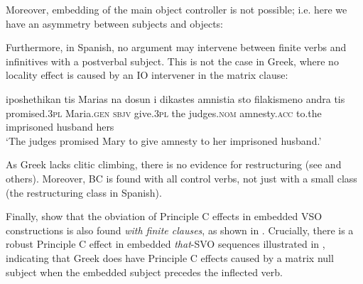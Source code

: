 \documentclass[output=paper]{langsci/langscibook}
\begin{document}
Moreover, embedding of the main object controller is not possible; i.e. here we have an asymmetry between subjects and objects:

\ea%
    \label{ex:alexiadou:22}
    \z
\z   


Furthermore, in Spanish, no argument may intervene between finite verbs and infinitives with a postverbal subject. This is not the case in Greek, where no locality effect is caused by an IO intervener in the matrix clause:

\begin{exe}%
\end{exe}

  

\ea%
    \label{ex:alexiadou:24}
    \gll iposhethikan     tis Marias  na  dosun       i dikastes     amnistia   sto filakismeno      andra     tis\\
         promised.\textsc{3pl}    Maria.\textsc{gen} \textsc{sbjv} give.\textsc{3pl} the judges.\textsc{nom}   amnesty.\textsc{acc} to.the imprisoned husband hers\\
    \glt   ‘The judges promised Mary to give amnesty to her imprisoned husband.’
    \z

As Greek lacks clitic climbing, there is no evidence for restructuring (see \citealt{Terzi1992} and others). Moreover, BC is found with all control verbs, not just with a small class (the restructuring class in Spanish).

Finally, \citet{Tsakali2017} show that the obviation of Principle C effects in embedded VSO constructions is also found \emph{with finite clauses}, as shown in . Crucially, there is a robust Principle C effect in embedded \textit{that}{}-SVO sequences illustrated in , indicating that Greek does have Principle C effects caused by a matrix null subject when the embedded subject precedes the inflected verb.
\end{document}
